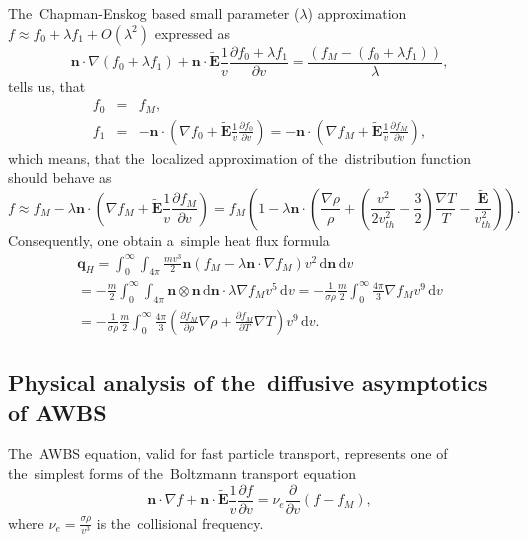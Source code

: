 \documentclass[review]{elsarticle}
\newcommand{\pdv}[2]{\frac{\partial{#1}}{\partial{#2}}}
\newcommand{\vect}[1]{\boldsymbol{#1}}
\newcommand{\dI}{\text{d}}
\newcommand{\mfp}{\lambda}
\newcommand{\nue}{\nu_{e}}
\newcommand{\vmag}{v}
\newcommand{\vth}{v_{th}}
\newcommand{\vn}{\vect{n}}
\newcommand{\tE}{\vect{\tilde{E}}}
\newcommand{\crs}{\sigma}
\newcommand{\fM}{f_M}
\begin{document}
The~Chapman-Enskog based small parameter ($\mfp$) approximation 
$f\approx f_0 + \lambda f_1 + O(\lambda^2)$ expressed as
\begin{equation}
  \vn\cdot\nabla (f_0 + \lambda f_1) +
  \vn\cdot\tE\frac{1}{\vmag}\pdv{f_0 + \lambda f_1 }{\vmag}= 
  \frac{\left(\fM - (f_0 + \lambda f_1)\right)}{\mfp} ,
  \label{eq:CE_BGK}
\end{equation}
tells us, that
\begin{eqnarray}
  f_0 &=& \fM, 
  \nonumber\\
  f_1 &=& - \vn\cdot
  \left(\nabla f_0 + \tE\frac{1}{\vmag}\pdv{f_0}{\vmag} \right) = 
  - \vn\cdot\left(\nabla\fM + \tE\frac{1}{\vmag}\pdv{\fM}{\vmag} \right),
  \nonumber
\end{eqnarray}
which means, that the~localized approximation of the~distribution function
should behave as
\begin{equation}
  f \approx \fM - \mfp\vn\cdot\left(\nabla \fM + \tE\frac{1}{\vmag}
  \pdv{\fM}{\vmag} \right)  
  = \fM \left(1 - \mfp\vn\cdot\left(\frac{\nabla\rho}{\rho} + 
  \left( \frac{\vmag^2}{2 \vth^2} - \frac{3}{2}\right) \frac{\nabla T}{T} 
  - \frac{\tE}{\vth^2} \right) \right) .
  \label{eq:f_localized}
\end{equation}
Consequently, one obtain a~simple heat flux formula
\begin{multline}
  \vect{q}_H = \int_0^\infty \int_{4\pi} 
  \frac{m \vmag^3}{2} 
  \vn\left( \fM - \mfp\vn\cdot\nabla \fM \right) \vmag^2\, \dI\vn\, \dI\vmag \\
  = - \frac{m}{2}\int_0^\infty \int_{4\pi}  
  \vn\otimes\vn\, \dI\vn \cdot \mfp \nabla\fM \vmag^5\, \dI\vmag 
  = - \frac{1}{\crs\rho}\frac{m}{2}\int_0^\infty \frac{4\pi}{3}
  \nabla\fM \vmag^9\, \dI\vmag \\
  = - \frac{1}{\crs\rho}\frac{m}{2}\int_0^\infty \frac{4\pi}{3}
  \left(\pdv{\fM}{\rho}\nabla\rho + \pdv{\fM}{T}\nabla T \right) 
  \vmag^9\, \dI\vmag .
\end{multline}

\subsection{Physical analysis of the~diffusive asymptotics of AWBS}\label{sec:diffusive_asymptotics_AWBS}
The~AWBS equation, valid for fast particle transport, represents 
one of the~simplest forms of the~Boltzmann transport equation
\begin{equation}
  \vn\cdot\nabla f + \vn\cdot\tE\frac{1}{\vmag}\pdv{f}{\vmag}
  = \nue \pdv{}{\vmag} \left(f - \fM\right) ,
  \label{eq:BGK}
\end{equation}
where $\nue = \frac{\crs \rho}{\vmag^3}$ is the~collisional frequency.
\end{document}

